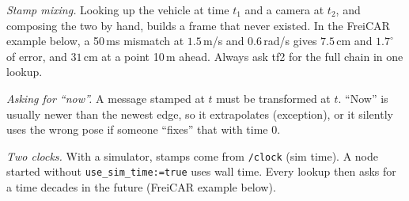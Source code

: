 \begin{pitfall}
\emph{Stamp mixing.} Looking up the vehicle at time $t_1$ and a camera at $t_2$, and composing the two by hand, builds a frame that never existed. In the FreiCAR example below, a 50\,ms mismatch at $1.5$\,m/s and $0.6$\,rad/s gives $7.5$\,cm and $1.7^\circ$ of error, and $31$\,cm at a point 10\,m ahead. Always ask tf2 for the full chain in one lookup.

\emph{Asking for ``now''.} A message stamped at $t$ must be transformed at $t$. ``Now'' is usually newer than the newest edge, so it extrapolates (exception), or it silently uses the wrong pose if someone ``fixes'' that with time 0.

\emph{Two clocks.} With a simulator, stamps come from \texttt{/clock} (sim time). A node started without \texttt{use\_sim\_time:=true} uses wall time. Every lookup then asks for a time decades in the future (FreiCAR example below).
\end{pitfall}
